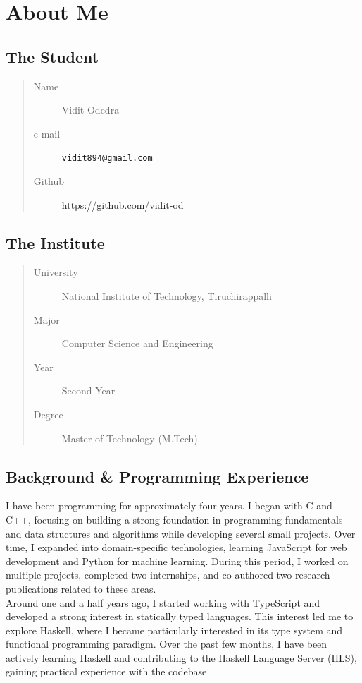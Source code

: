 \documentclass[a4paper,12pt]{article}
\begin{document}
\section{About Me}

\subsection*{The Student}
\begin{quote}
  \begin{description}
    \item [Name] {Vidit Odedra}
    \item [e-mail] {\href{mailto:vidit894@gmail.com}
      {\nolinkurl{vidit894@gmail.com}}}
    \item [Github] {\url{https://github.com/vidit-od}}
  \end{description}
\end{quote}

\subsection*{The Institute}
\begin{quote}
  \begin{description}
    \item [University] {National Institute of Technology, Tiruchirappalli}
    \item [Major] {Computer Science and Engineering}
    \item [Year] {Second Year}
    \item [Degree] {Master of Technology (M.Tech)}
  \end{description}
\end{quote}

\subsection*{Background \& Programming Experience}
I have been programming for approximately four years. I began with C and C++, focusing on building a strong foundation in programming fundamentals and data structures and algorithms while developing several small projects. Over time, I expanded into domain-specific technologies, learning JavaScript for web development and Python for machine learning. During this period, I worked on multiple projects, completed two internships, and co-authored two research publications related to these areas.
\vspace{0.8em}
\\ Around one and a half years ago, I started working with TypeScript and developed a strong interest in statically typed languages. This interest led me to explore Haskell, where I became particularly interested in its type system and functional programming paradigm. Over the past few months, I have been actively learning Haskell and contributing to the Haskell Language Server (HLS), gaining practical experience with the codebase
\end{document}
